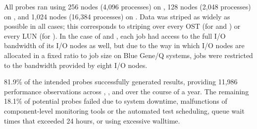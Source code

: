 All probes ran using 256 nodes (4,096 processes) on \cori, 128 nodes (2,048 processes) on \edison, and 1,024 nodes (16,384 processes) on \mira.
Data was striped as widely as possible in all cases; this corresponds to
striping over every OST (for \cori and \edison) or every LUN (for \mira).
In the case of \cori and \edison, each job had access to the full I/O bandwidth of its I/O nodes as well, but due to the way in which I/O nodes are allocated in a fixed ratio to job size on Blue Gene/Q systems, \mira jobs were restricted to the bandwidth provided by eight I/O nodes.

81.9\% of the intended probes successfully generated results, providing 
11,986 performance observations across \mira, \cori, and \edison over the
course of a year.
The remaining 18.1\% of potential probes failed due to system downtime, malfunctions of component-level monitoring tools or the automated test scheduling, queue wait times that exceeded 24 hours, or using excessive walltime.


